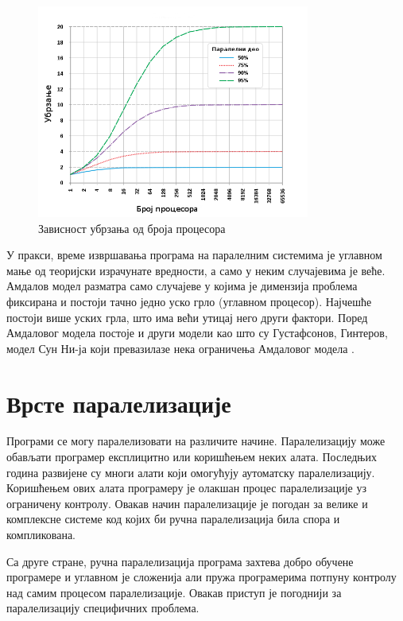 \documentclass[12pt,oneside]{memoir}
\begin{document}
 \begin{figure}[!ht]
  \centering
  \includegraphics[width=0.8\textwidth]{img/amdal.png}
  \caption{Зависност убрзања од броја процесора}
  \label{fig:amdal}
\end{figure}



 У пракси, време извршавања програма на паралелним системима је углавном мање од теоријски израчунате вредности, а само у неким случајевима је веће. Амдалов модел разматра само случајеве у којима је димензија проблема фиксирана и постоји тачно једно уско грло (углавном процесор). Најчешће постоји више уских грла, што има већи утицај него други фактори. Поред Амдаловог модела постоје и други модели као што су Густафсонов, Гинтеров, модел Сун Ни-ја који превазилазе нека ограничења Амдаловог модела \cite{performance}.


  \section{Врсте паралелизације}
  
 Програми се могу паралелизовати на различите начине. Паралелизацију може обављати програмер експлицитно или коришћењем неких алата. Последњих година развијене су многи алати који омогућују аутоматску паралелизацију. Коришћењем ових алата програмеру је олакшан процес паралелизације уз ограничену контролу. Овакав начин паралелизације је погодан за велике и комплексне системе код којих би ручна паралелизација била спора и компликована.
 
  Са друге стране, ручна паралелизација програма захтева добро обучене програмере и углавном је сложенија али пружа програмерима потпуну контролу над самим процесом паралелизације. Овакав приступ је погоднији за паралелизацију специфичних проблема.
\end{document}
